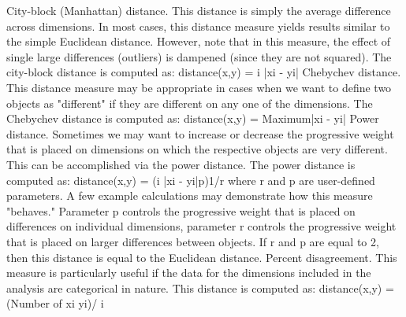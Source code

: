 City-block (Manhattan) distance. This distance is simply the average difference across dimensions. In most cases, this distance measure yields results similar to the simple Euclidean distance. However, note that in this measure, the effect of single large differences (outliers) is dampened (since they are not squared). The city-block distance is computed as:
distance(x,y) = i |xi - yi|
Chebychev distance. This distance measure may be appropriate in cases when we want to define two objects as "different" if they are different on any one of the dimensions. The Chebychev distance is computed as:
distance(x,y) = Maximum|xi - yi|
Power distance. Sometimes we may want to increase or decrease the progressive weight that is placed on dimensions on which the respective objects are very different. This can be accomplished via the power distance. The power distance is computed as:
distance(x,y) = (i |xi - yi|p)1/r
where r and p are user-defined parameters. A few example calculations may demonstrate how this measure "behaves." Parameter p controls the progressive weight that is placed on differences on individual dimensions, parameter r controls the progressive weight that is placed on larger differences between objects. If r and p are equal to 2, then this distance is equal to the Euclidean distance.
Percent disagreement. This measure is particularly useful if the data for the dimensions included in the analysis are categorical in nature. This distance is computed as:
distance(x,y) = (Number of xi  yi)/ i
